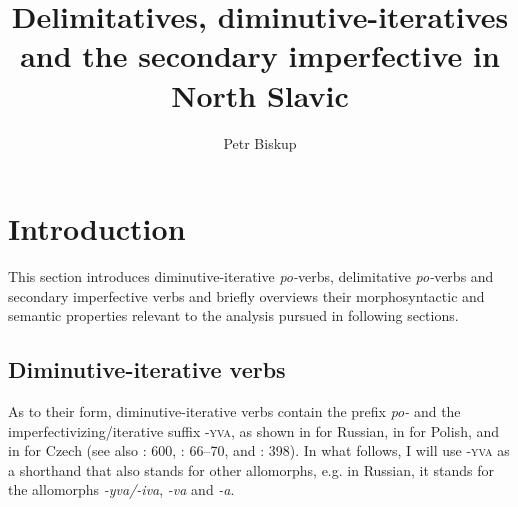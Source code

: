 \documentclass[output=paper,colorlinks,citecolor=brown]{langscibook}
\author{Petr Biskup\orcid{0000-0003-2602-8856}\affiliation{University of Leipzig}}
\title[Delimitatives, diminutive-iteratives and the secondary imperfective]{Delimitatives, diminutive-iteratives and the secondary imperfective in North Slavic}
\begin{document}
\maketitle

% 


\iffalse
noch offen vom Typesestting:

    - examples (10)-(12): asterisk placed on an English translation; here I'd be in favor of doing something like "cf. \textit{*to be reading for a while}" (rationale: it's about the ungrammaticality of the English example, not of the reading/interpretation, that's why I'd use italics (and introduce it by cf.)
    - examples (31), (32), (33), (35), (36) are semantic formulas; (46) is a syntactic tree
    - above (32), after po-delimitatives, there's a dot before "necessary" which, however, is not capitalized... the sentence structure is unclear
    - Biskup (to appear) needs a reference
    - (37) contains a star in the translation; consider reformulation
    - (47) - asterisks within an example, without glosses and translations, please fix (either into one example with slashes, or with full subexamples, but then please with glosses and intended meanings).
    - (48) - intended meaning missing
    - Biskup (2020) needs more specification in the bibliography

\fi



\section{Introduction}\label{biskup:sec:intro}

This section introduces diminutive-iterative \textit{po-}verbs, delimitative \textit{po-}verbs and secondary imperfective verbs and briefly overviews their morphosyntactic and semantic properties relevant to the analysis pursued in following sections.

\subsection{Diminutive-iterative verbs}\label{biskup:sec:intro-dim}

As to their form, diminutive-iterative verbs contain the prefix \textit{po-} and the imperfectivizing/iterative suffix \textsc{-yva}, as shown in  for Russian, in  for Polish, and in  for Czech (see also \citealt{bis:Svedova1980}: 600, \citealt{Katny1994}: 66--70, and \citealt{Petr1986}: 398). In what follows, I will use \textsc{-yva} as a shorthand that also stands for other allomorphs, e.g. in Russian, it stands for the allomorphs \textit{-yva/-iva}, \textit{-va} and \textit{-a}.%
\end{document}
